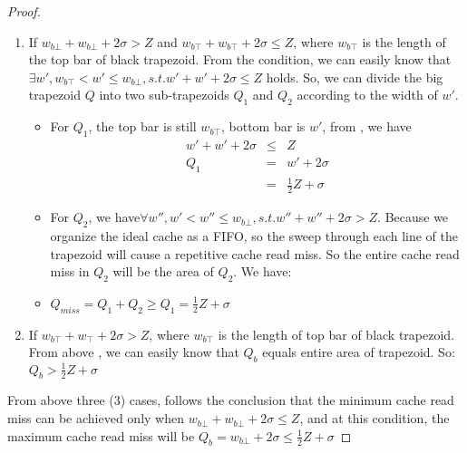 \begin{proof}
\begin{enumerate}
	\item \label{case:bottomTrapezoid2} 
		  If $w_{b\bot} + w_{b\bot} + 2 \sigma > Z$ 
		  and $w_{b\top} + w_{b\top} + 2 \sigma \leq Z$, where $w_{b\top}$ is the length
		  of the top bar of black trapezoid. From the
          condition, we can easily know that $\exists w', w_{b\top} < w' \leq
          w_{b\bot}, s.t. w' + w' + 2 \sigma \leq Z$ holds. 
          So, we can divide the big trapezoid
          $Q$ into two sub-trapezoids $Q_1$ and $Q_2$ according to the
          width of $w'$. \label{case:bottomTrapezoid2}
	\begin{itemize}
		\item For $Q_1$, the top bar is still $w_{b\top}$, bottom bar is $w'$, from
		, we have
		\begin{eqnarray}		
		w' + w' + 2 \sigma & \leq & Z \\
		Q_1  & = & w' + 2 \sigma \\
			 & = & \frac{1}{2} Z + \sigma
		\end{eqnarray}

		\item For $Q_2$, we have$\forall w'', w' < w'' \leq w_{b\bot}, s.t. 
				  w'' + w'' + 2 \sigma > Z$. Because we organize the ideal cache as a
                  FIFO, so the sweep through each line of the
                  trapezoid will cause a repetitive
                  cache read miss. So the entire cache read miss in
                  $Q_2$ will be the area of $Q_2$. We
                  have: \label{case:bottomTrapezoid2}
		\item $Q_{miss} = Q_1 + Q_2 \geq Q_1 = \frac{1}{2} Z + \sigma$
	\end{itemize} 

	\item If $w_{b\top} + w_{\top} + 2 \sigma > Z$, where $w_{b\top}$ is the length
		  of top bar of black trapezoid. From above
          , we can easily know that
          $Q_b$ equals entire area of
          trapezoid. So: $Q_b > \frac{1}{2} Z + \sigma$\label{case:bottomTrapezoid3}
\end{enumerate}

From above three (3) cases, follows the conclusion that the minimum cache read miss can be
achieved only when $w_{b\bot} + w_{b\bot} + 2 \sigma \leq Z$, 
and at this condition, the maximum cache read miss will be
$Q_b = w_{b\bot} + 2 \sigma \leq \frac{1}{2} Z + \sigma$
\end{proof}


